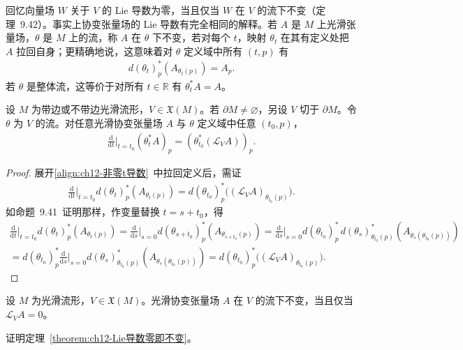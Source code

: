 \documentclass[../../main.tex]{subfiles}
\begin{document}
回忆向量场 $W$ 关于 $V$ 的 Lie 导数为零，当且仅当 $W$ 在 $V$ 的流下不变（定理~9.42）。事实上协变张量场的 Lie 导数有完全相同的解释。若 $A$ 是 $M$ 上光滑张量场，$\theta$ 是 $M$ 上的流，称 $A$ 在 $\theta$ 下不变，若对每个 $t$，映射 $\theta_t$ 在其有定义处把 $A$ 拉回自身；更精确地说，这意味着对 $\theta$ 定义域中所有 $(t,p)$ 有
\begin{align*}
d(\theta_t)^*_p(A_{\theta_t(p)})=A_p.
\end{align*}
若 $\theta$ 是整体流，这等价于对所有 $t\in\mathbb{R}$ 有 $\theta_t^*A=A$。

\begin{proposition}\label{proposition:ch12-非零t导数}
设 $M$ 为带边或不带边光滑流形，$V\in\mathfrak X(M)$。若 $\partial M\neq\varnothing$，另设 $V$ 切于 $\partial M$。令 $\theta$ 为 $V$ 的流。对任意光滑协变张量场 $A$ 与 $\theta$ 定义域中任意 $(t_0,p)$，
\begin{align}
\frac{\mathrm{d}}{\mathrm{d}t}\bigg|_{t=t_0}(\theta_t^*A)_p=(\theta_{t_0}^*(\mathcal L_V A))_p.\label{align:ch12-非零t导数}
\end{align}
\end{proposition}

\begin{proof}
展开\eqref{align:ch12-非零t导数}~中拉回定义后，需证
\begin{align*}
\frac{\mathrm{d}}{\mathrm{d}t}\bigg|_{t=t_0}d(\theta_t)^*_p(A_{\theta_t(p)})=d(\theta_{t_0})^*_p\big((\mathcal L_V A)_{\theta_{t_0}(p)}\big).
\end{align*}
如命题~9.41~证明那样，作变量替换 $t=s+t_0$，得
\begin{align*}
\frac{\mathrm{d}}{\mathrm{d}t}\bigg|_{t=t_0}d(\theta_t)^*_p(A_{\theta_t(p)})
=\frac{\mathrm{d}}{\mathrm{d}s}\bigg|_{s=0}d(\theta_{s+t_0})^*_p(A_{\theta_{s+t_0}(p)})
=\frac{\mathrm{d}}{\mathrm{d}s}\bigg|_{s=0}d(\theta_{t_0})^*_p\,d(\theta_s)^*_{\theta_{t_0}(p)}(A_{\theta_s(\theta_{t_0}(p))})\\
=d(\theta_{t_0})^*_p\frac{\mathrm{d}}{\mathrm{d}s}\bigg|_{s=0}d(\theta_s)^*_{\theta_{t_0}(p)}(A_{\theta_s(\theta_{t_0}(p))})
=d(\theta_{t_0})^*_p\big((\mathcal L_V A)_{\theta_{t_0}(p)}\big).
\end{align*}
\end{proof}

\begin{theorem}\label{theorem:ch12-Lie导数零即不变}
设 $M$ 为光滑流形，$V\in\mathfrak X(M)$。光滑协变张量场 $A$ 在 $V$ 的流下不变，当且仅当 $\mathcal L_V A=0$。
\end{theorem}

\begin{exercise}\label{exercise:ch12-38}
证明定理~\ref{theorem:ch12-Lie导数零即不变}。
\end{exercise}
\end{document}
